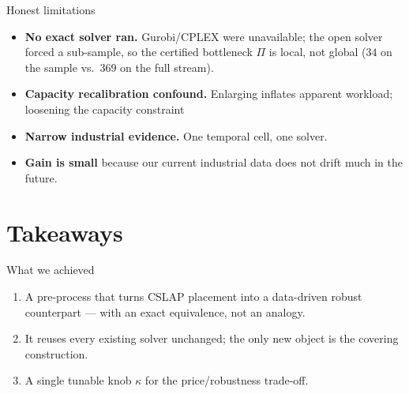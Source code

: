 \documentclass[11pt,aspectratio=169]{beamer}
\newcommand{\kk}{\kappa}
\begin{document}
\begin{frame}{Honest limitations}
  \begin{itemize}
    \item \textbf{No exact solver ran.} Gurobi/CPLEX were unavailable; the open
          solver forced a sub-sample, so the certified bottleneck $\Pi$ is local,
          not global ($34$ on the sample vs.\ $369$ on the full stream).
    \item \textbf{Capacity recalibration confound.} Enlarging inflates apparent
          workload; loosening the capacity constraint 
    \item \textbf{Narrow industrial evidence.} One temporal cell, one solver.
    \item \textbf{Gain is small} because our current industrial data does not drift much in the future.
  \end{itemize}
\end{frame}

\section{Takeaways}
\begin{frame}{What we achieved}
  \begin{enumerate}
    \item A \alert{pre-process} that turns CSLAP placement into a data-driven
          \alert{robust counterpart} --- with an exact equivalence, not an analogy.
    \item It reuses every existing solver \alert{unchanged}; the only new object
          is the covering construction.
    \item A single tunable knob $\kk$ for the price/robustness trade-off.
  \end{enumerate}
\end{frame}
\end{document}
